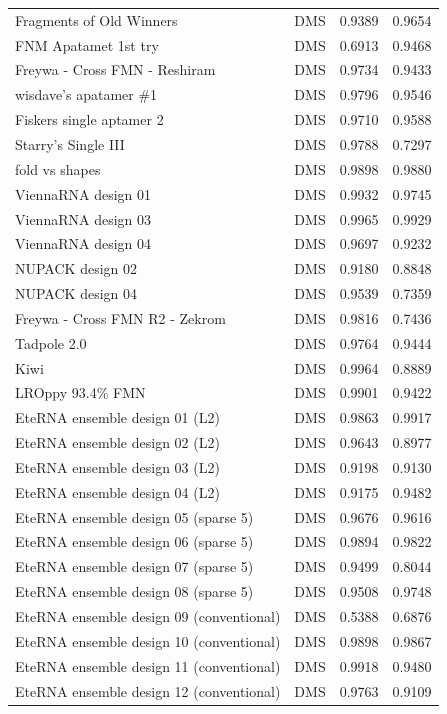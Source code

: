 \documentclass[letter]{bioinfo}
\begin{document}
\begin{center}
\begin{longtable}{lccc}
Fragments of Old Winners	&	DMS	&	0.9389 	&	0.9654 	\\
FNM Apatamet 1st try	&	DMS	&	0.6913 	&	0.9468 	\\
Freywa - Cross FMN - Reshiram	&	DMS	&	0.9734 	&	0.9433 	\\
wisdave's apatamer \#1	&	DMS	&	0.9796 	&	0.9546 	\\
Fiskers single aptamer 2	&	DMS	&	0.9710 	&	0.9588 	\\
Starry's Single III	&	DMS	&	0.9788 	&	0.7297 	\\
fold vs shapes	&	DMS	&	0.9898 	&	0.9880 	\\
ViennaRNA design 01	&	DMS	&	0.9932 	&	0.9745 	\\
ViennaRNA design 03	&	DMS	&	0.9965 	&	0.9929 	\\
ViennaRNA design 04	&	DMS	&	0.9697 	&	0.9232 	\\
NUPACK design 02	&	DMS	&	0.9180 	&	0.8848 	\\
NUPACK design 04	&	DMS	&	0.9539 	&	0.7359 	\\
Freywa - Cross FMN R2 - Zekrom	&	DMS	&	0.9816 	&	0.7436 	\\
Tadpole 2.0	&	DMS	&	0.9764 	&	0.9444 	\\
Kiwi	&	DMS	&	0.9964 	&	0.8889 	\\
LROppy 93.4\% FMN	&	DMS	&	0.9901 	&	0.9422 	\\
EteRNA ensemble design 01 (L2)	&	DMS	&	0.9863 	&	0.9917 	\\
EteRNA ensemble design 02 (L2)	&	DMS	&	0.9643 	&	0.8977 	\\
EteRNA ensemble design 03 (L2)	&	DMS	&	0.9198 	&	0.9130 	\\
EteRNA ensemble design 04 (L2)	&	DMS	&	0.9175 	&	0.9482 	\\
EteRNA ensemble design 05 (sparse 5)	&	DMS	&	0.9676 	&	0.9616 	\\
EteRNA ensemble design 06 (sparse 5)	&	DMS	&	0.9894 	&	0.9822 	\\
EteRNA ensemble design 07 (sparse 5)	&	DMS	&	0.9499 	&	0.8044 	\\
EteRNA ensemble design 08 (sparse 5)	&	DMS	&	0.9508 	&	0.9748 	\\
EteRNA ensemble design 09 (conventional)	&	DMS	&	0.5388 	&	0.6876 	\\
EteRNA ensemble design 10 (conventional)	&	DMS	&	0.9898 	&	0.9867 	\\
EteRNA ensemble design 11 (conventional)	&	DMS	&	0.9918 	&	0.9480 	\\
EteRNA ensemble design 12 (conventional)	&	DMS	&	0.9763 	&	0.9109 	\\

\end{longtable}
\end{center}
\end{document}
